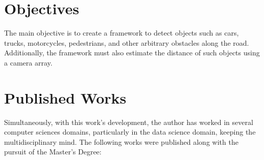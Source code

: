 \section{Objectives}

The main objective is to create a framework to detect objects such as cars, trucks, motorcycles, pedestrians, and other arbitrary obstacles along the road. Additionally, the framework must also estimate the distance of such objects using a camera array.

\section{Published Works}

Simultaneously, with this work's development, the author has worked in several computer sciences domains, particularly in the data science domain, keeping the multidisciplinary mind. The following works were published along with the pursuit of the Master's Degree:

